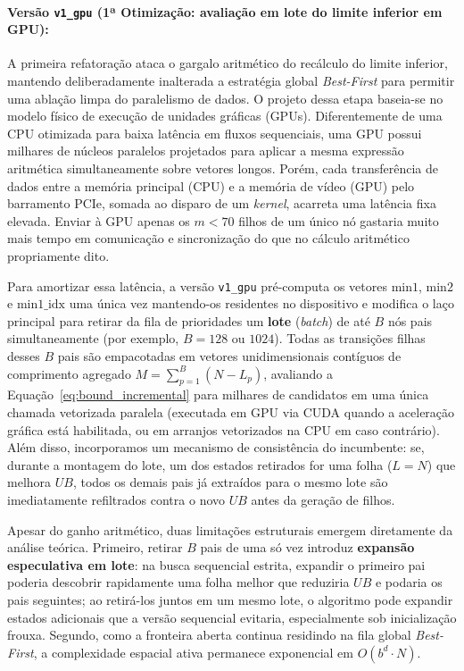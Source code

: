 \paragraph{Versão \texttt{v1\_gpu} (1ª Otimização: avaliação em lote do limite inferior em GPU):}
A primeira refatoração ataca o gargalo aritmético do recálculo do limite inferior, mantendo
deliberadamente inalterada a estratégia global \textit{Best-First} para permitir uma ablação
limpa do paralelismo de dados. O projeto dessa etapa baseia-se no modelo físico de execução de
unidades gráficas (GPUs). Diferentemente de uma CPU otimizada para baixa latência em fluxos
sequenciais, uma GPU possui milhares de núcleos paralelos projetados para aplicar a mesma
expressão aritmética simultaneamente sobre vetores longos. Porém, cada transferência de dados
entre a memória principal (CPU) e a memória de vídeo (GPU) pelo barramento PCIe, somada ao
disparo de um \textit{kernel}, acarreta uma latência fixa elevada. Enviar à GPU apenas os
$m < 70$ filhos de um único nó gastaria muito mais tempo em comunicação e sincronização do que
no cálculo aritmético propriamente dito.

Para amortizar essa latência, a versão \texttt{v1\_gpu} pré-computa os vetores $\text{min1}$,
$\text{min2}$ e $\text{min1\_idx}$ uma única vez mantendo-os residentes no dispositivo e modifica
o laço principal para retirar da fila de prioridades um \textbf{lote} (\textit{batch}) de até
$B$ nós pais simultaneamente (por exemplo, $B = 128$ ou $1024$). Todas as transições filhas
desses $B$ pais são empacotadas em vetores unidimensionais contíguos de comprimento agregado
$M = \sum_{p=1}^{B} (N - L_p)$, avaliando a Equação~\eqref{eq:bound_incremental} para milhares
de candidatos em uma única chamada vetorizada paralela (executada em GPU via CUDA quando a
aceleração gráfica está habilitada, ou em arranjos vetorizados na CPU em caso contrário). Além
disso, incorporamos um mecanismo de consistência do incumbente: se, durante a montagem do lote,
um dos estados retirados for uma folha ($L = N$) que melhora $UB$, todos os demais pais já
extraídos para o mesmo lote são imediatamente refiltrados contra o novo $UB$ antes da geração
de filhos.

Apesar do ganho aritmético, duas limitações estruturais emergem diretamente da análise teórica.
Primeiro, retirar $B$ pais de uma só vez introduz \textbf{expansão especulativa em lote}: na
busca sequencial estrita, expandir o primeiro pai poderia descobrir rapidamente uma folha
melhor que reduziria $UB$ e podaria os pais seguintes; ao retirá-los juntos em um mesmo lote,
o algoritmo pode expandir estados adicionais que a versão sequencial evitaria, especialmente
sob inicialização frouxa. Segundo, como a fronteira aberta continua residindo na fila global
\textit{Best-First}, a complexidade espacial ativa permanece exponencial em $O(b^d \cdot N)$.

